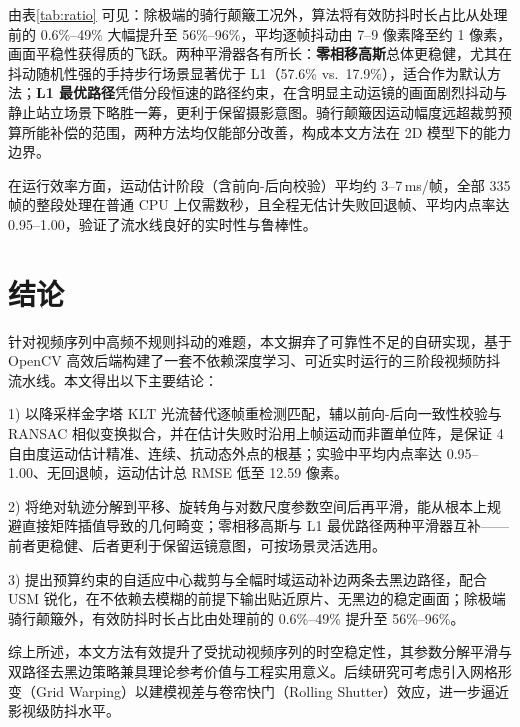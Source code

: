 \documentclass[10.5pt,twocolumn]{aaas}
\begin{document}
由表\ref{tab:ratio} 可见：除极端的骑行颠簸工况外，算法将有效防抖时长占比从处理前的 0.6\%--49\% 大幅提升至 56\%--96\%，平均逐帧抖动由 7--9 像素降至约 1 像素，画面平稳性获得质的飞跃。两种平滑器各有所长：\textbf{零相移高斯}总体更稳健，尤其在抖动随机性强的手持步行场景显著优于 L1（57.6\% vs.\ 17.9\%），适合作为默认方法；\textbf{L1 最优路径}凭借分段恒速的路径约束，在含明显主动运镜的画面剧烈抖动与静止站立场景下略胜一筹，更利于保留摄影意图。骑行颠簸因运动幅度远超裁剪预算所能补偿的范围，两种方法均仅能部分改善，构成本文方法在 2D 模型下的能力边界。

在运行效率方面，运动估计阶段（含前向-后向校验）平均约 3--7\,ms/帧，全部 335 帧的整段处理在普通 CPU 上仅需数秒，且全程无估计失败回退帧、平均内点率达 0.95--1.00，验证了流水线良好的实时性与鲁棒性。

\section{结\quad 论}
针对视频序列中高频不规则抖动的难题，本文摒弃了可靠性不足的自研实现，基于 OpenCV 高效后端构建了一套不依赖深度学习、可近实时运行的三阶段视频防抖流水线。本文得出以下主要结论：

1) 以降采样金字塔 KLT 光流替代逐帧重检测匹配，辅以前向-后向一致性校验与 RANSAC 相似变换拟合，并在估计失败时沿用上帧运动而非置单位阵，是保证 4 自由度运动估计精准、连续、抗动态外点的根基；实验中平均内点率达 0.95--1.00、无回退帧，运动估计总 RMSE 低至 12.59 像素。

2) 将绝对轨迹分解到平移、旋转角与对数尺度参数空间后再平滑，能从根本上规避直接矩阵插值导致的几何畸变；零相移高斯与 L1 最优路径两种平滑器互补——前者更稳健、后者更利于保留运镜意图，可按场景灵活选用。

3) 提出预算约束的自适应中心裁剪与全幅时域运动补边两条去黑边路径，配合 USM 锐化，在不依赖去模糊的前提下输出贴近原片、无黑边的稳定画面；除极端骑行颠簸外，有效防抖时长占比由处理前的 0.6\%--49\% 提升至 56\%--96\%。

综上所述，本文方法有效提升了受扰动视频序列的时空稳定性，其参数分解平滑与双路径去黑边策略兼具理论参考价值与工程实用意义。后续研究可考虑引入网格形变（Grid Warping）以建模视差与卷帘快门（Rolling Shutter）效应，进一步逼近影视级防抖水平。




\end{document}
